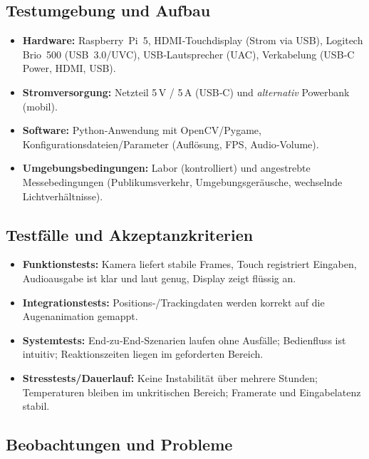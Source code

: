 \subsection{Testumgebung und Aufbau}
\label{cha:Testumgebung und Aufbau}

\begin{itemize}
	\item \textbf{Hardware:} Raspberry~Pi~5, HDMI‑Touchdisplay (Strom via USB), Logitech Brio~500 (USB~3.0/UVC), USB‑Lautsprecher (UAC), Verkabelung (USB‑C Power, HDMI, USB).
	\item \textbf{Stromversorgung:} Netzteil 5\,V / 5\,A (USB‑C) und \textit{alternativ} Powerbank (mobil).
	\item \textbf{Software:} Python‑Anwendung mit OpenCV/Pygame, Konfigurationsdateien/Parameter (Auflösung, FPS, Audio‑Volume).
	\item \textbf{Umgebungsbedingungen:} Labor (kontrolliert) und angestrebte Messebedingungen (Publikumsverkehr, Umgebungsgeräusche, wechselnde Lichtverhältnisse).
\end{itemize}

\subsection{Testfälle und Akzeptanzkriterien}
\label{cha:Testfälle und Akzeptanzkriterien}

\begin{itemize}
	\item \textbf{Funktionstests:} Kamera liefert stabile Frames, Touch registriert Eingaben, Audioausgabe ist klar und laut genug, Display zeigt flüssig an.
	\item \textbf{Integrationstests:} Positions‑/Trackingdaten werden korrekt auf die Augenanimation gemappt.
	\item \textbf{Systemtests:} End‑zu‑End‑Szenarien laufen ohne Ausfälle; Bedienfluss ist intuitiv; Reaktionszeiten liegen im geforderten Bereich.
	\item \textbf{Stresstests/Dauerlauf:} Keine Instabilität über mehrere Stunden; Temperaturen bleiben im unkritischen Bereich; Framerate und Eingabelatenz stabil.
\end{itemize}

\subsection{Beobachtungen und Probleme}
\label{cha:Beobachtungen und Probleme}

